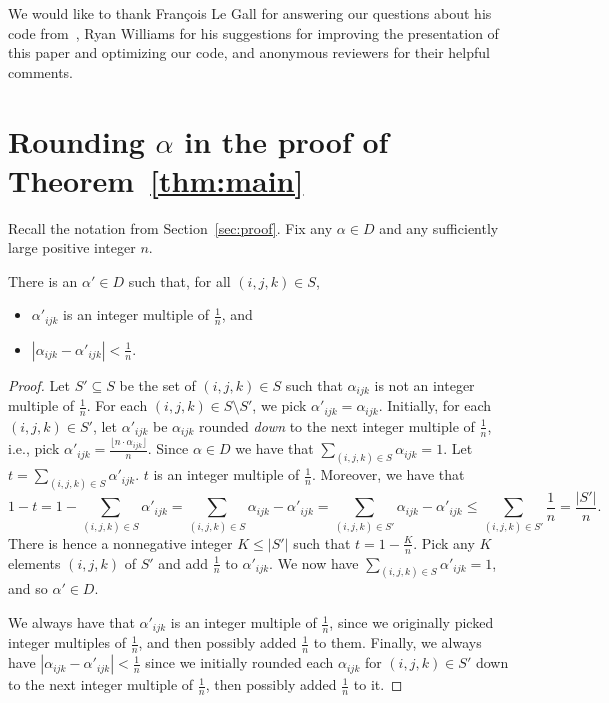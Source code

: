 \documentclass{theoretics}
\begin{document}
We would like to thank Fran{\c{c}}ois Le Gall for answering our questions about his code from~\cite{legall},  Ryan Williams for his suggestions for improving the presentation of this paper and optimizing our code, and anonymous reviewers for their helpful comments. 
 

\printbibliography

\appendix 

\section{Rounding \texorpdfstring{$\alpha$}{alpha} in the proof of \texorpdfstring{Theorem~\ref{thm:main}}{Theorem 4.1}}\label{app:rounding}

Recall the notation from Section~\ref{sec:proof}. Fix any $\alpha \in D$ and any sufficiently large positive integer $n$. 

\begin{lemma}
There is an $\alpha' \in D$ such that, for all $(i,j,k) \in S$,
\begin{itemize}
    \item $\alpha'_{ijk}$ is an integer multiple of $\frac{1}{n}$, and
    \item $|\alpha_{ijk} - \alpha'_{ijk}| < \frac{1}{n}$.
\end{itemize}
\end{lemma}

\begin{proof}
Let $S' \subseteq S$ be the set of $(i,j,k) \in S$ such that $\alpha_{ijk}$ is not an integer multiple of $\frac{1}{n}$.
For each $(i,j,k) \in S \setminus S'$, we pick $\alpha'_{ijk} = \alpha_{ijk}$. Initially, for each $(i,j,k) \in S'$, let $\alpha'_{ijk}$ be $\alpha_{ijk}$ rounded \emph{down} to the next integer multiple of $\frac{1}{n}$, i.e., pick $\alpha'_{ijk} = \frac{\lfloor n \cdot \alpha_{ijk} \rfloor}{n}$. Since $\alpha \in D$ we have that $\sum_{(i,j,k) \in S} \alpha_{ijk} = 1$. Let $t = \sum_{(i,j,k) \in S} \alpha'_{ijk}$. $t$ is an integer multiple of $\frac{1}{n}$. Moreover, we have that
$$1 - t = 1 - \sum_{(i,j,k) \in S} \alpha'_{ijk} = \sum_{(i,j,k) \in S} \alpha_{ijk} - \alpha'_{ijk} =  \sum_{(i,j,k) \in S'} \alpha_{ijk} - \alpha'_{ijk} \leq \sum_{(i,j,k) \in S'} \frac{1}{n} = \frac{|S'|}{n}.$$
There is hence a nonnegative integer $K \leq |S'|$ such that $t = 1 - \frac{K}{n}$. Pick any $K$ elements $(i,j,k)$ of $S'$ and add $\frac{1}{n}$ to $\alpha'_{ijk}$. We now have $\sum_{(i,j,k) \in S} \alpha'_{ijk} = 1$, and so $\alpha' \in D$.

We always have that $\alpha'_{ijk}$ is an integer multiple of $\frac{1}{n}$, since we originally picked integer multiples of $\frac{1}{n}$, and then possibly added $\frac{1}{n}$ to them. Finally, we always have $|\alpha_{ijk} - \alpha'_{ijk}| < \frac{1}{n}$ since we initially rounded each $\alpha_{ijk}$ for $(i,j,k) \in S'$ down to the next integer multiple of $\frac{1}{n}$, then possibly added $\frac{1}{n}$ to it.
\end{proof}
\end{document}
